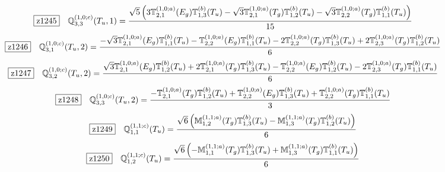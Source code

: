 \documentclass[fleqn,10pt,landscape]{jsarticle}
\begin{document}
\begin{dmath*}
\hspace*{3mm}\fbox{z1245}\quad \mathbb{Q}_{3,3}^{(1,0;c)}(T_{u},1)=\frac{\sqrt{5} \left(3 \mathbb{T}_{2,1}^{(1,0;a)}(E_{g}) \mathbb{T}_{1,3}^{(b)}(T_{u}) - \sqrt{3} \mathbb{T}_{2,1}^{(1,0;a)}(T_{g}) \mathbb{T}_{1,2}^{(b)}(T_{u}) - \sqrt{3} \mathbb{T}_{2,2}^{(1,0;a)}(T_{g}) \mathbb{T}_{1,1}^{(b)}(T_{u})\right)}{15}
\end{dmath*}
\begin{dmath*}
\hspace*{3mm}\fbox{z1246}\quad \mathbb{Q}_{3,1}^{(1,0;c)}(T_{u},2)=\frac{- \sqrt{3} \mathbb{T}_{2,1}^{(1,0;a)}(E_{g}) \mathbb{T}_{1,1}^{(b)}(T_{u}) - \mathbb{T}_{2,2}^{(1,0;a)}(E_{g}) \mathbb{T}_{1,1}^{(b)}(T_{u}) - 2 \mathbb{T}_{2,2}^{(1,0;a)}(T_{g}) \mathbb{T}_{1,3}^{(b)}(T_{u}) + 2 \mathbb{T}_{2,3}^{(1,0;a)}(T_{g}) \mathbb{T}_{1,2}^{(b)}(T_{u})}{6}
\end{dmath*}
\begin{dmath*}
\hspace*{3mm}\fbox{z1247}\quad \mathbb{Q}_{3,2}^{(1,0;c)}(T_{u},2)=\frac{\sqrt{3} \mathbb{T}_{2,1}^{(1,0;a)}(E_{g}) \mathbb{T}_{1,2}^{(b)}(T_{u}) + 2 \mathbb{T}_{2,1}^{(1,0;a)}(T_{g}) \mathbb{T}_{1,3}^{(b)}(T_{u}) - \mathbb{T}_{2,2}^{(1,0;a)}(E_{g}) \mathbb{T}_{1,2}^{(b)}(T_{u}) - 2 \mathbb{T}_{2,3}^{(1,0;a)}(T_{g}) \mathbb{T}_{1,1}^{(b)}(T_{u})}{6}
\end{dmath*}
\begin{dmath*}
\hspace*{3mm}\fbox{z1248}\quad \mathbb{Q}_{3,3}^{(1,0;c)}(T_{u},2)=\frac{- \mathbb{T}_{2,1}^{(1,0;a)}(T_{g}) \mathbb{T}_{1,2}^{(b)}(T_{u}) + \mathbb{T}_{2,2}^{(1,0;a)}(E_{g}) \mathbb{T}_{1,3}^{(b)}(T_{u}) + \mathbb{T}_{2,2}^{(1,0;a)}(T_{g}) \mathbb{T}_{1,1}^{(b)}(T_{u})}{3}
\end{dmath*}
\begin{dmath*}
\hspace*{3mm}\fbox{z1249}\quad \mathbb{Q}_{1,1}^{(1,1;c)}(T_{u})=\frac{\sqrt{6} \left(\mathbb{M}_{1,2}^{(1,1;a)}(T_{g}) \mathbb{T}_{1,3}^{(b)}(T_{u}) - \mathbb{M}_{1,3}^{(1,1;a)}(T_{g}) \mathbb{T}_{1,2}^{(b)}(T_{u})\right)}{6}
\end{dmath*}
\begin{dmath*}
\hspace*{3mm}\fbox{z1250}\quad \mathbb{Q}_{1,2}^{(1,1;c)}(T_{u})=\frac{\sqrt{6} \left(- \mathbb{M}_{1,1}^{(1,1;a)}(T_{g}) \mathbb{T}_{1,3}^{(b)}(T_{u}) + \mathbb{M}_{1,3}^{(1,1;a)}(T_{g}) \mathbb{T}_{1,1}^{(b)}(T_{u})\right)}{6}
\end{dmath*}
\end{document}
